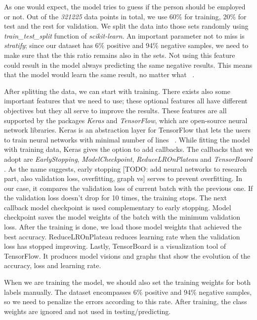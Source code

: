 As one would expect, the model tries to guess if the person should be employed or not. Out of the \textit{321225} data points in total, we use 60\% for training, 20\% for test and the rest for validation. We split the data into those sets randomly using \textit{train\_test\_split} function of \textit{scikit-learn}. An important parameter not to miss is \textit{stratify}; since our dataset has  6\% positive and 94\% negative samples, we need to make sure that the this ratio remains also in the sets. Not using this feature could result in the model always predicting the same negative results. This means that the model would learn the same result, no matter what ~\parencite{singh2015survey}.

After splitting the data, we can start with training. There exists also some important features that we need to use; these optional features all have different objectives but they all serve to improve the results. These features are all supported by the packages \textit{Keras} and \textit{TensorFlow}, which are open-source neural network libraries. Keras is an abstraction layer for TensorFlow that lets the users to train neural networks with minimal number of lines ~\parencite{chollet2018deep}. While fitting the model with training data, Keras gives the option to add callbacks. The callbacks that we adopt are \textit{EarlyStopping}, \textit{ModelCheckpoint},  \textit{ReduceLROnPlateau} and \textit{TensorBoard} . As the name suggests, early stopping [TODO: add neural networks to research part, also validation loss, overfitting, graph vs] serves to prevent overfitting. In our case, it compares the validation loss of current batch with the previous one. If the validation loss doesn't drop for 10 times, the training stops. The next callback model checkpoint is used complementary to early stopping. Model checkpoint saves the model weights of the batch with the minimum validation loss. After the training is done, we load those model weights that achieved the best accuracy. ReduceLROnPlateau reduces learning rate when the validation loss has stopped improving. Lastly, TensorBoard is a visualization tool of TensorFlow. It produces model visions and graphs that show the evolution of the accuracy, loss and learning rate. 

When we are training the model, we should also set the training weights for both labels manually. The dataset encompasses 6\% positive and 94\% negative samples, so we need to penalize the errors according to this rate. After training, the class weights are ignored and not used in testing/predicting.


